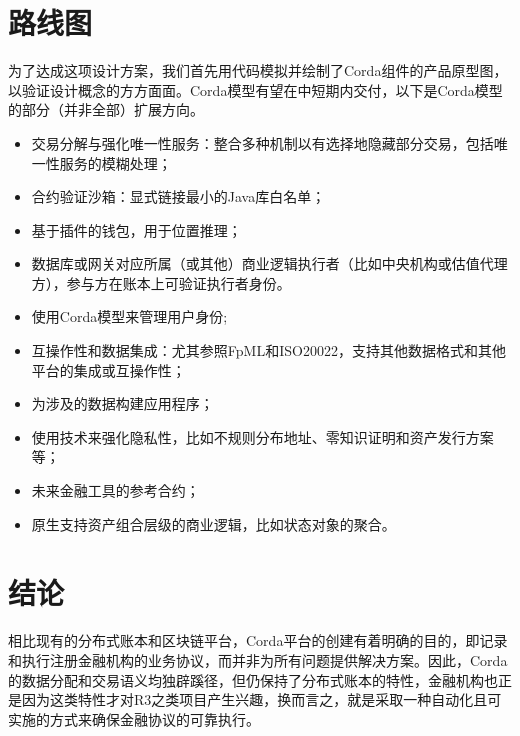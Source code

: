 \documentclass[UTF8]{ctexart}
\begin{document}



\section{路线图}
为了达成这项设计方案，我们首先用代码模拟并绘制了Corda组件的产品原型图，以验证设计概念的方方面面。Corda模型有望在中短期内交付，以下是Corda模型的部分（并非全部）扩展方向。
\begin{itemize}	
 \item 交易分解与强化唯一性服务：整合多种机制以有选择地隐藏部分交易，包括唯一性服务的模糊处理；
\item 合约验证沙箱：显式链接最小的Java库白名单；
\item 基于插件的钱包，用于位置推理；
\item 数据库或网关对应所属（或其他）商业逻辑执行者（比如中央机构或估值代理方），参与方在账本上可验证执行者身份。
\item 使用Corda模型来管理用户身份;
\item 互操作性和数据集成：尤其参照FpML和ISO20022，支持其他数据格式和其他平台的集成或互操作性；
\item 为涉及的数据构建应用程序；
\item 使用技术来强化隐私性，比如不规则分布地址、零知识证明和资产发行方案等；
\item 未来金融工具的参考合约；
\item 原生支持资产组合层级的商业逻辑，比如状态对象的聚合。
\end{itemize}
\section{结论}
相比现有的分布式账本和区块链平台，Corda平台的创建有着明确的目的，即记录和执行注册金融机构的业务协议，而并非为所有问题提供解决方案。因此，Corda的数据分配和交易语义均独辟蹊径，但仍保持了分布式账本的特性，金融机构也正是因为这类特性才对R3之类项目产生兴趣，换而言之，就是采取一种自动化且可实施的方式来确保金融协议的可靠执行。


\end{document}

